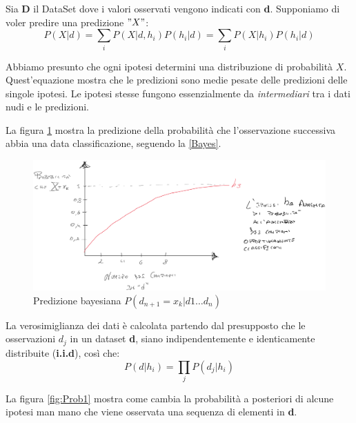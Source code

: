 \begin{definizione}
Sia \textbf{D} il DataSet dove i valori osservati vengono indicati con \textbf{d}. Supponiamo di voler predire una predizione $"X"$:
\begin{equation}
    P(X|d)=\sum_{i}P(X|d, h_i)P(h_i|d) = \sum_{i}P(X|h_i)P(h_i|d) 
    \label{Bayes}
\end{equation}
\begin{nota}
    Abbiamo presunto che ogni ipotesi determini una distribuzione di probabilità $X$. Quest'equazione mostra che le predizioni sono medie pesate delle predizioni delle singole ipotesi. Le ipotesi stesse fungono essenzialmente da \textit{intermediari} tra i dati nudi e le predizioni.
\end{nota}
\end{definizione}
La figura \ref{fig:Prob2} mostra la predizione della probabilità che l'osservazione successiva abbia una data classificazione, seguendo la \ref{Bayes}. 
\begin{figure}[H]
    \centering
    \includegraphics[width=1\textwidth]{img/prob2.png}
    \caption{Predizione bayesiana $P(d_{n+1} = x_k | d1 \dots d_n)$}
    \label{fig:Prob2}
\end{figure}
\begin{definizione}[Verosimiglianza]
  La verosimiglianza dei dati è calcolata partendo dal presupposto che le osservazioni $d_j$ in un dataset \textbf{d}, siano indipendentemente e identicamente distribuite (\textbf{i.i.d}), così che:
  \[P(d|h_i)=\prod_{j}P(d_j|h_i)\]
\end{definizione}
La figura \ref{fig:Prob1} mostra come cambia la probabilità a posteriori di alcune ipotesi man mano che viene osservata una sequenza di elementi in \textbf{d}.
